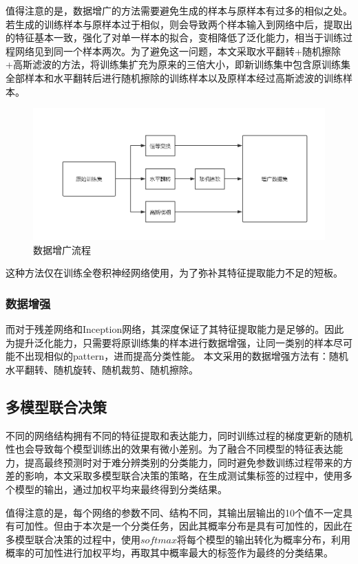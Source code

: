 \documentclass[UTF8]{ctexart}
\begin{document}
值得注意的是，数据增广的方法需要避免生成的样本与原样本有过多的相似之处。若生成的训练样本与原样本过于相似，则会导致两个样本输入到网络中后，提取出的特征基本一致，强化了对单一样本的拟合，变相降低了泛化能力，相当于训练过程网络见到同一个样本两次。为了避免这一问题，本文采取水平翻转+随机擦除+高斯滤波的方法，将训练集扩充为原来的三倍大小，即新训练集中包含原训练集全部样本和水平翻转后进行随机擦除的训练样本以及原样本经过高斯滤波的训练样本。
\begin{figure}[H]
    \centering
    \includegraphics[scale=0.3]{../images/dataaug.png}
    \caption{数据增广流程}
\end{figure}
这种方法仅在训练全卷积神经网络使用，为了弥补其特征提取能力不足的短板。

\subsubsection{数据增强}

而对于残差网络和Inception网络，其深度保证了其特征提取能力是足够的。因此为提升泛化能力，只需要将原训练集的样本进行数据增强，让同一类别的样本尽可能不出现相似的pattern，进而提高分类性能。
本文采用的数据增强方法有：随机水平翻转、随机旋转、随机裁剪、随机擦除。


\subsection{多模型联合决策}

不同的网络结构拥有不同的特征提取和表达能力，同时训练过程的梯度更新的随机性也会导致每个模型训练出的效果有微小差别。为了融合不同模型的特征表达能力，提高最终预测时对于难分辨类别的分类能力，同时避免参数训练过程带来的方差的影响，本文采取多模型联合决策的策略，在生成测试集标签的过程中，使用多个模型的输出，通过加权平均来最终得到分类结果。

值得注意的是，每个网络的参数不同、结构不同，其输出层输出的10个值不一定具有可加性。但由于本次是一个分类任务，因此其概率分布是具有可加性的，因此在多模型联合决策的过程中，使用$softmax$将每个模型的输出转化为概率分布，利用概率的可加性进行加权平均，再取其中概率最大的标签作为最终的分类结果。
\end{document}
